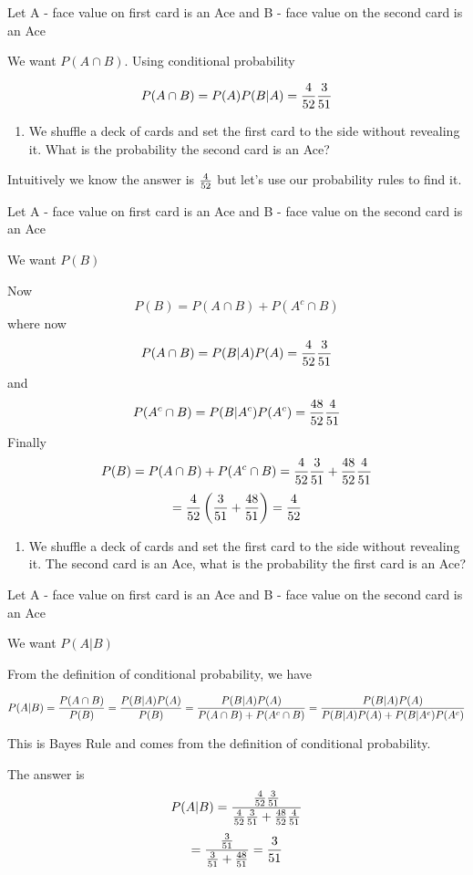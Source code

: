 \documentclass[]{book}
\providecommand{\tightlist}{%
  \setlength{\itemsep}{0pt}\setlength{\parskip}{0pt}}
\theoremstyle{definition}
\theoremstyle{definition}
\theoremstyle{definition}
\theoremstyle{remark}
\begin{document}
Let A - face value on first card is an Ace and B - face value on the
second card is an Ace

We want \(P(A \cap B)\). Using conditional probability

\[P(A \cap B) =P(A)P(B|A)={4 \over 52}{3 \over 51}\]

\begin{enumerate}
\def\labelenumi{\arabic{enumi}.}
\setcounter{enumi}{2}
\tightlist
\item
  We shuffle a deck of cards and set the first card to the side without
  revealing it. What is the probability the second card is an Ace?
\end{enumerate}

Intuitively we know the answer is \({4 \over 52}\) but let's use our
probability rules to find it.

Let A - face value on first card is an Ace and B - face value on the
second card is an Ace

We want \(P(B)\)

Now \[P(B)=P(A \cap B)+P(A^c \cap B)\] where now
\[P(A \cap B)=P(B|A)P(A)={4 \over 52}{3 \over 51}\] and
\[P(A^c \cap B)=P(B|A^c)P(A^c)={48 \over 52}{4 \over 51}\] Finally
\[P(B)=P(A \cap B)+P(A^c \cap B)={4 \over 52}{3 \over 51}+{48 \over 52}{4 \over 51}\]
\[={4 \over 52}\left({3 \over 51}+{48 \over 51}\right)={4 \over 52}\]

\begin{enumerate}
\def\labelenumi{\arabic{enumi}.}
\setcounter{enumi}{3}
\tightlist
\item
  We shuffle a deck of cards and set the first card to the side without
  revealing it. The second card is an Ace, what is the probability the
  first card is an Ace?
\end{enumerate}

Let A - face value on first card is an Ace and B - face value on the
second card is an Ace

We want \(P(A|B)\)

From the definition of conditional probability, we have

\[P(A|B)={P(A \cap B) \over P(B)}={P(B|A)P(A) \over P(B)}={P(B|A)P(A) \over P(A \cap B)+P(A^c \cap B)}={P(B|A)P(A) \over P(B|A)P(A)+P(B|A^c)P(A^c)}\]

This is Bayes Rule and comes from the definition of conditional
probability.

The answer is
\[P(A|B)={{4 \over 52}{3 \over 51} \over {4 \over 52}{3 \over 51}+ {48 \over 52}{4 \over 51}}\]
\[={{3 \over 51} \over {3 \over 51}+ {48 \over 51}}={3 \over 51}\]
\end{document}
